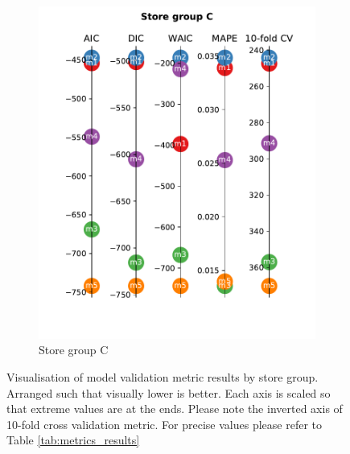 \documentclass[english, 12pt, a4paper, sci, utf8, a-1b, online]{aaltothesis}
\begin{document}
\begin{figure}
	\begin{subfigure}[htb]{0.5\textwidth}
		\centering
		\includegraphics[width=\textwidth]{../plots/metrics/metrics_plot_C.pdf}
		\caption{Store group C}
		\label{fig:metrics_C}
	\end{subfigure}
	\caption{\label{fig:metrics_visualization}Visualisation of model validation metric results by store group. Arranged such that visually lower is better.
	Each axis is scaled so that extreme values are at the ends. Please note the inverted axis of 10-fold cross validation metric. For 
	precise values please refer to Table \ref{tab:metrics_results}}
\end{figure}
\end{document}
